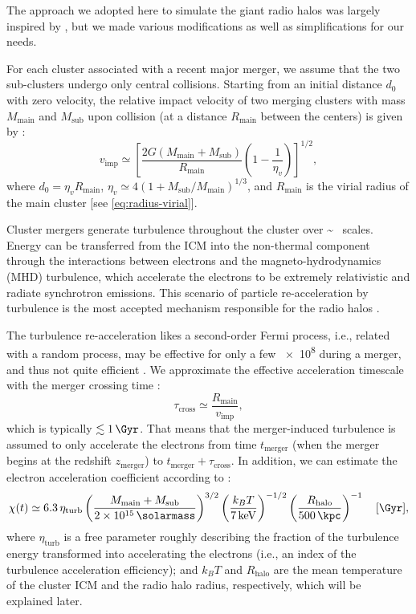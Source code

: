 \documentclass[modern]{aastex61}
\newcommand{\R}[1]{\mathrm{#1}}
\begin{document}
The approach we adopted here to simulate the giant radio halos
was largely inspired by \citet{cassano2005}, but we
made various modifications as well as simplifications for our needs.

For each cluster associated with a recent major merger, we assume that
the two sub-clusters undergo only central collisions.
Starting from an initial distance $d_0$ with zero velocity,
the relative impact velocity of two merging clusters with mass
$M_{\R{main}}$ and $M_{\R{sub}}$ upon collision (at a distance
$R_{\R{main}}$ between the centers) is given by
\citep{cassano2005,sarazin2002}:
\begin{equation}
  \label{eq:v-imp}
  v_{\R{imp}} \simeq \left[
    \frac{2G (M_{\R{main}} + M_{\R{sub}})}{R_{\R{main}}}
    \left( 1 - \frac{1}{\eta_v} \right)\right]^{1/2},
\end{equation}
where $d_0 = \eta_v R_{\R{main}}$,
$\eta_v \simeq 4 (1 + M_{\R{sub}}/M_{\R{main}})^{1/3}$,
and $R_{\R{main}}$ is the virial radius of the main cluster
[see \autoref{eq:radius-virial}].

Cluster mergers generate turbulence throughout the cluster over
\si{\sim \Mpc} scales.
Energy can be transferred from the ICM into the non-thermal
component through the interactions between electrons and the
magneto-hydrodynamics (MHD) turbulence, which accelerate the electrons
to be extremely relativistic and radiate synchrotron emissions.
This scenario of particle re-acceleration by turbulence is the most
accepted mechanism responsible for the radio halos \citep{feretti2012rev}.

The turbulence re-acceleration likes a second-order Fermi process, i.e.,
related with a random process, may be effective for only a few
\SI{e8}{\year} during a merger, and thus not quite efficient
\citep{feretti2012rev,ensslin2011}.
We approximate the effective acceleration timescale with the merger
crossing time \citep{cassano2005}:
\begin{equation}
  \label{eq:tau-cross}
  \tau_{\R{cross}} \simeq \frac{R_{\R{main}}}{v_{\R{imp}}},
\end{equation}
which is typically $\lesssim \SI{1}{\Gyr}$.
That means that the merger-induced turbulence is assumed to only accelerate
the electrons from time $t_{\R{merger}}$ (when the merger begins at the
redshift $z_{\R{merger}}$) to $t_{\R{merger}} + \tau_{\R{cross}}$.
In addition, we can estimate the electron acceleration coefficient
according to \citep{cassano2005}:
\begin{equation}
  \label{eq:electron-acc}
  \chi(t) \simeq 6.3 \,\eta_{\R{turb}}
      \left( \frac{M_{\R{main}} + M_{\R{sub}}}{\SI{2e15}{\solarmass}} \right)^{3/2}
      \left( \frac{k_BT}{\SI{7}{\keV}} \right)^{-1/2}
      \left( \frac{R_{\R{halo}}}{\SI{500}{\kpc}} \right)^{-1}
  \quad [\si{\per\Gyr}],
\end{equation}
where $\eta_{\R{turb}}$ is a free parameter roughly describing the fraction
of the turbulence energy transformed into accelerating the electrons (i.e.,
an index of the turbulence acceleration efficiency);
and $k_BT$ and $R_{\R{halo}}$ are the mean temperature of the cluster ICM
and the radio halo radius, respectively, which will be explained later.
\end{document}
